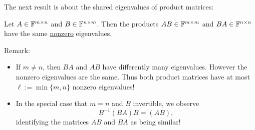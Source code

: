 \begin{frame}
The next result is about the shared eigenvalues of product matrices:\\
\begin{lemma} \label{lem:eigvalsProducts}
	Let $A\in {\mathbb{F}}^{m \times n}$ and $B \in {\mathbb{F}}^{n \times m}$. Then the products $AB \in {\mathbb{F}}^{m \times m}$ and $BA \in {\mathbb{F}}^{n\times n}$ have the same \underline{nonzero} eigenvalues.
\end{lemma}
Remark: 
\begin{itemize}
	\item If $m\neq n$, then $BA$ and $AB$ have differently many eigenvalues. However the nonzero eigenvalues are the same. Thus both product matrices have at most $\ell := \min\{m,n\}$ nonzero eigenvalues!
	\item In the special case that $m=n$ and $B$ invertible, we observe $$B^{-1}(BA)B = (AB), $$
	identifying the matrices $AB$ and $BA$ as being similar!
\end{itemize}
\end{frame}
 
